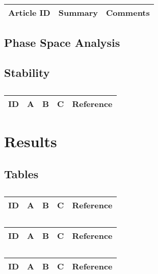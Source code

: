 \begin{table}[H]\centering
	\begin{tabular}{p{1cm}p{4cm}p{3cm}}
		Article ID & Summary & Comments\\
		\hline
		\hline
	\end{tabular}
\end{table}

\subsection{Phase Space Analysis}

\subsection{Stability}
\centering
\begin{table}[H]\footnotesize
	\caption{}
	\begin{tabular}{rp{1cm}p{2cm}p{3cm}p{1cm}}
		\hline
		ID & A & B & C & Reference \\
		\hline
		\hline
	\end{tabular}
\end{table}
\raggedright


\section{Results}


\subsection{Tables}

\centering
\begin{table}[H]\footnotesize
	\caption{}
	\begin{tabular}{rp{1cm}p{2cm}p{3cm}p{1cm}}
		\hline
		ID & A & B & C & Reference \\
		\hline
		\hline
	\end{tabular}
\end{table}
\raggedright

\centering
\begin{table}[H]\footnotesize
	\caption{}
	\begin{tabular}{rp{1cm}p{2cm}p{3cm}p{1cm}}
		\hline
		ID & A & B & C & Reference \\
		\hline
		\hline
	\end{tabular}
\end{table}
\raggedright

\centering
\begin{table}[H]\footnotesize
	\caption{}
	\begin{tabular}{rp{1cm}p{2cm}p{3cm}p{1cm}}
		\hline
		ID & A & B & C & Reference \\
		\hline
		\hline
	\end{tabular}
\end{table}
\raggedright


